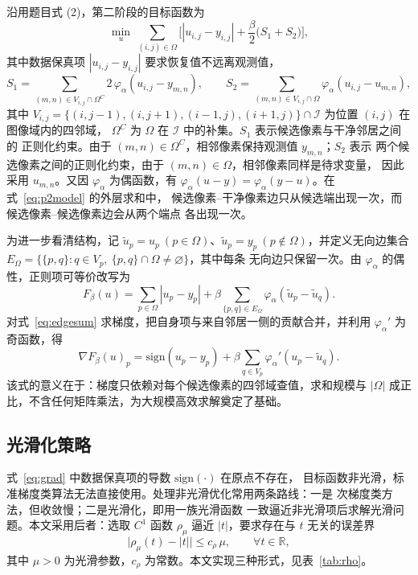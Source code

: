 \documentclass[withoutpreface,bwprint]{cumcmthesis}
\begin{document}
沿用题目式 (2)，第二阶段的目标函数为
\begin{equation}
  \min_{u}\ \sum_{(i,j)\in\Omega}\Big[|u_{i,j}-y_{i,j}|+\frac{\beta}{2}\big(S_1+S_2\big)\Big],
  \label{eq:p2model}
\end{equation}
其中数据保真项 $|u_{i,j}-y_{i,j}|$ 要求恢复值不远离观测值，
\begin{equation}
  S_1=\sum_{(m,n)\in V_{i,j}\cap\Omega^{C}}2\,\varphi_{\alpha}(u_{i,j}-y_{m,n}),
  \qquad
  S_2=\sum_{(m,n)\in V_{i,j}\cap\Omega}\varphi_{\alpha}(u_{i,j}-u_{m,n}),
\end{equation}
其中 $V_{i,j}=\{(i,j-1),(i,j+1),(i-1,j),(i+1,j)\}\cap\mathcal I$ 为位置
$(i,j)$ 在图像域内的四邻域，
$\Omega^{C}$ 为 $\Omega$ 在 $\mathcal I$ 中的补集。$S_1$ 表示候选像素与干净邻居之间的
正则化约束。由于 $(m,n)\in\Omega^C$，相邻像素保持观测值 $y_{m,n}$；$S_2$ 表示
两个候选像素之间的正则化约束，由于 $(m,n)\in\Omega$，相邻像素同样是待求变量，
因此采用 $u_{m,n}$。又因 $\varphi_\alpha$ 为偶函数，有
$\varphi_\alpha(u-y)=\varphi_\alpha(y-u)$。在式~\eqref{eq:p2model} 的外层求和中，
候选像素--干净像素边只从候选端出现一次，而候选像素--候选像素边会从两个端点
各出现一次。

为进一步看清结构，记 $\tilde u_p=u_p\ (p\in\Omega)$、$\tilde u_p=y_p\
(p\notin\Omega)$，并定义无向边集合
$E_{\Omega}=\{\{p,q\}:q\in V_p,\ \{p,q\}\cap\Omega\neq\varnothing\}$，其中每条
无向边只保留一次。由 $\varphi_{\alpha}$ 的偶性，正则项可等价改写为
\begin{equation}
  F_{\beta}(u)=\sum_{p\in\Omega}|u_p-y_p|+\beta\sum_{\{p,q\}\in E_{\Omega}}
  \varphi_{\alpha}(\tilde u_p-\tilde u_q).
  \label{eq:edgesum}
\end{equation}
对式~\eqref{eq:edgesum} 求梯度，把自身项与来自邻居一侧的贡献合并，并利用
$\varphi_{\alpha}'$ 为奇函数，得
\begin{equation}
  \nabla F_{\beta}(u)_p=\mathrm{sign}(u_p-y_p)+\beta\sum_{q\in V_p}
  \varphi_{\alpha}'(u_p-\tilde u_q).
  \label{eq:grad}
\end{equation}
该式的意义在于：梯度只依赖对每个候选像素的四邻域查值，求和规模与 $|\Omega|$
成正比，不含任何矩阵乘法，为大规模高效求解奠定了基础。

\subsection{光滑化策略}

式~\eqref{eq:grad} 中数据保真项的导数 $\mathrm{sign}(\cdot)$ 在原点不存在，
目标函数非光滑，标准梯度类算法无法直接使用。处理非光滑优化常用两条路线：一是
次梯度类方法，但收敛慢；二是光滑化，即用一族光滑函数
一致逼近非光滑项后求解光滑问题。本文采用后者：选取 $C^1$ 函数 $\rho_{\mu}$
逼近 $|t|$，要求存在与 $t$ 无关的误差界
\begin{equation}
  \big|\rho_{\mu}(t)-|t|\big|\le c_{\rho}\,\mu,\qquad \forall t\in\mathbb{R},
  \label{eq:rhobound}
\end{equation}
其中 $\mu>0$ 为光滑参数，$c_{\rho}$ 为常数。本文实现三种形式，见表~\ref{tab:rho}。
\end{document}

